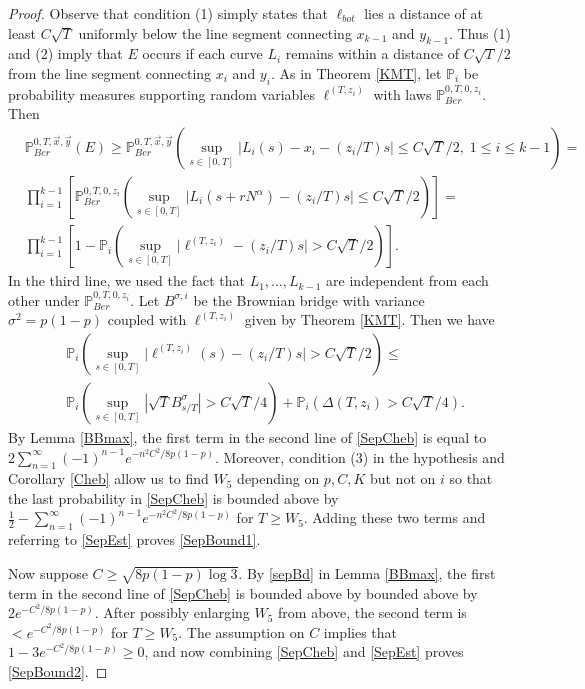 \begin{proof}
	Observe that condition (1) simply states that $\ell_{bot}$ lies a distance of at least $C\sqrt{T}$ uniformly below the line segment connecting $x_{k-1}$ and $y_{k-1}$. Thus (1) and (2) imply that $E$ occurs if each curve $L_i$ remains within a distance of $C\sqrt{T}/2$ from the line segment connecting $x_i$ and $y_i$. As in Theorem \ref{KMT}, let $\mathbb{P}_i$ be probability measures supporting random variables $\ell^{(T,z_i)}$ with laws $\mathbb{P}^{0,T,0,z_i}_{Ber}$. Then
	\begin{equation}\label{SepEst}
	\begin{split}
	& \mathbb{P}^{0, T,\vec{x},\vec{y}}_{Ber} (E) \geq \mathbb{P}^{0,T,\vec{x},\vec{y}}_{Ber} \left(\sup_{s\in[0,T]} \big|L_i(s) - x_i - (z_i/T)s\big| \leq C\sqrt{T}/2, \;1\leq i\leq k-1\right) =\\
	&\prod_{i=1}^{k-1}\left[ \mathbb{P}^{0,T,0,z_i}_{Ber} \left(\sup_{s\in[0,T]} \big|L_i(s+rN^\alpha) - (z_i/T)s\big| \leq C\sqrt{T}/2\right)\right] =\\
	&\prod_{i=1}^{k-1}\left[ 1 - \mathbb{P}_i\left(\sup_{s\in[0,T]} \big|\ell^{(T,z_i)} - (z_i/T)s\big| > C\sqrt{T}/2\right)\right]. \end{split}
	\end{equation}
	In the third line, we used the fact that $L_1,\dots,L_{k-1}$ are independent from each other under $\mathbb{P}^{0,T,0,z_i}_{Ber}$. Let $B^{\sigma,i}$ be the Brownian bridge with variance $\sigma^2 = p(1-p)$ coupled with $\ell^{(T,z_i)}$ given by Theorem \ref{KMT}. Then we have
	\begin{equation}\label{SepCheb}
	\begin{split}
	&\mathbb{P}_i \left(\sup_{s\in[0,T]} \big|\ell^{(T,z_i)}(s) - (z_i/T)s\big| > C\sqrt{T}/2\right) \leq \\
	& \mathbb{P}_i\left(\sup_{s\in[0,T]} |\sqrt{T}B^{\sigma}_{s/T}| > C\sqrt{T}/4\right) + \mathbb{P}_i\left(\Delta(T,z_i) > C\sqrt{T}/4\right).
	\end{split}
	\end{equation}
	By Lemma \ref{BBmax}, the first term in the second line of \eqref{SepCheb} is equal to $2\sum_{n=1}^\infty (-1)^{n-1} e^{-n^2C^2/8p(1-p)}$. Moreover, condition (3) in the hypothesis and Corollary \ref{Cheb} allow us to find $W_5$ depending on $p,C,K$ but not on $i$ so that the last probability in \eqref{SepCheb} is bounded above by $\frac{1}{2} - \sum_{n=1}^\infty (-1)^{n-1} e^{-n^2C^2/8p(1-p)}$ for $T\geq W_5$. Adding these two terms and referring to \eqref{SepEst} proves \eqref{SepBound1}.
	
	Now suppose $C\geq\sqrt{8p(1-p)\log 3}$. By \eqref{sepBd} in Lemma \ref{BBmax}, the first term in the second line of \eqref{SepCheb} is bounded above by bounded above by $2e^{-C^2/8p(1-p)}$. After possibly enlarging $W_5$ from above, the second term is $<e^{-C^2/8p(1-p)}$ for $T\geq W_5$. The assumption on $C$ implies that $1-3e^{-C^2/8p(1-p)}\geq 0$, and now combining \eqref{SepCheb} and \eqref{SepEst} proves \eqref{SepBound2}.
\end{proof}



